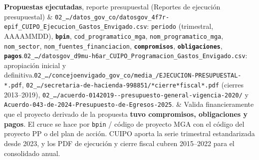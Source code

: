 \documentclass[11pt,a4paper]{article}
\begin{document}
{\begin{longtable}
\textbf{Propuestas ejecutadas}, reporte presupuestal (Reportes de ejecución presupuestal) & \texttt{02\_\allowbreak{}\ldots{}/\allowbreak{}datos\_\allowbreak{}gov\_\allowbreak{}co/\allowbreak{}datosgov\_\allowbreak{}4f7r-\allowbreak{}epif\_\allowbreak{}CUIPO\_\allowbreak{}Ejecucion\_\allowbreak{}Gastos\_\allowbreak{}Envigado.\allowbreak{}csv}: \texttt{periodo} (trimestral, AAAAMMDD), \textbf{\texttt{bpin}}, \texttt{cod\_\allowbreak{}programatico\_\allowbreak{}mga}, \texttt{nom\_\allowbreak{}programatico\_\allowbreak{}mga}, \texttt{nom\_\allowbreak{}sector}, \texttt{nom\_\allowbreak{}fuentes\_\allowbreak{}financiacion}, \textbf{\texttt{compromisos}}, \textbf{\texttt{obligaciones}}, \textbf{\texttt{pagos}}.\newline \texttt{02\_\allowbreak{}\ldots{}/\allowbreak{}datosgov\_\allowbreak{}d9mu-\allowbreak{}h6ar\_\allowbreak{}CUIPO\_\allowbreak{}Programacion\_\allowbreak{}Gastos\_\allowbreak{}Envigado.\allowbreak{}csv}: apropiación inicial y definitiva.\newline \texttt{02\_\allowbreak{}\ldots{}/\allowbreak{}concejoenvigado\_\allowbreak{}gov\_\allowbreak{}co/\allowbreak{}media\_\allowbreak{}/\allowbreak{}EJECUCION-\allowbreak{}PRESUPUESTAL-\allowbreak{}*.\allowbreak{}pdf}, \texttt{02\_\allowbreak{}\ldots{}/\allowbreak{}secretaria-\allowbreak{}de-\allowbreak{}hacienda-\allowbreak{}998851/\allowbreak{}*cierre*fiscal*.\allowbreak{}pdf} (cierres 2013–2019), \texttt{02\_\allowbreak{}\ldots{}/\allowbreak{}acuerdo-\allowbreak{}0142019-\allowbreak{}-\allowbreak{}presupuesto-\allowbreak{}general-\allowbreak{}vigencia-\allowbreak{}2020/\allowbreak{}} y \texttt{Acuerdo-\allowbreak{}043-\allowbreak{}de-\allowbreak{}2024-\allowbreak{}Presupuesto-\allowbreak{}de-\allowbreak{}Egresos-\allowbreak{}2025}. & Valida financieramente que el proyecto derivado de la propuesta \textbf{tuvo compromisos, obligaciones y pagos}. El cruce se hace por \texttt{bpin} / código de proyecto MGA con el código del proyecto PP o del plan de acción. CUIPO aporta la serie trimestral estandarizada desde 2023, y los PDF de ejecución y cierre fiscal cubren 2015–2022 para el consolidado anual. \\

\end{longtable}}
\end{document}
